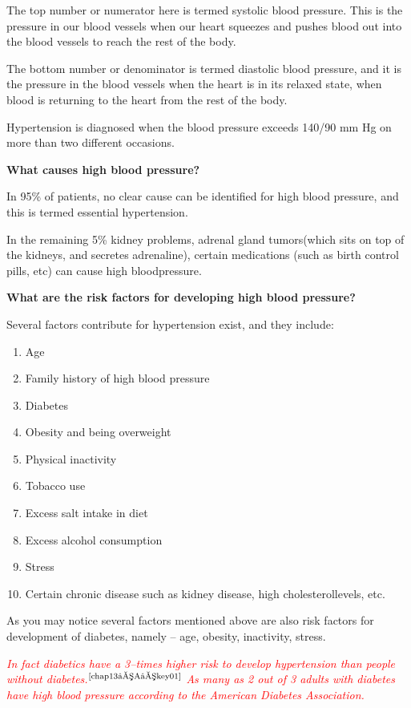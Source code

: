 The top number or numerator here is termed systolic blood pre\-ssure. This is the pressure in our blood vessels when our heart squeezes and pushes blood out into the blood vessels to reach the rest of the body.

The bottom number or denominator is termed diastolic blood pre\-ssure, and it is the pressure in the blood vessels when the heart is in its relaxed state, when blood is returning to the heart from the rest of the body.

Hypertension is diagnosed when the blood pressure exceeds 140/90 mm Hg on more than two different occasions.

\vskip 10pt
\noindent\textbf{What causes high blood pressure?}

In 95\% of patients, no clear cause can be identified for high blood pressure, and this is termed essential hypertension.

In the remaining 5\% kidney problems, adrenal gland tumors\break (which sits on top of the kidneys, and secretes adrenaline), certain medications (such as birth control pills, etc) can cause high blood\break pressure.

\vskip 10pt
\noindent\textbf{What are the risk factors for developing high blood pressure?}

\noindent Several factors contribute for hypertension exist, and they include:
\begin{enumerate}[•]
\itemsep=0pt
\item Age
\item Family history of high blood pressure
\item Diabetes
\item Obesity and being overweight
\item Physical inactivity
\item Tobacco use
\item Excess salt intake in diet
\item Excess alcohol consumption
\item Stress
\item Certain chronic disease such as kidney disease, high cholesterol\break levels, etc.
\end{enumerate}

As you may notice several factors mentioned above are also risk factors for development of diabetes, namely – age, obesity, inactivity, stress.

\textcolor{red}{\textit{In fact diabetics have a 3–times higher risk to develop hypertension than people without diabetes.}}$^{\text{\cite{chap13–A–key01}}}$ \textcolor{red}{\textit{As many as 2 out of 3 adults with diabetes have high blood pressure according to the American Diabetes Association.}}

